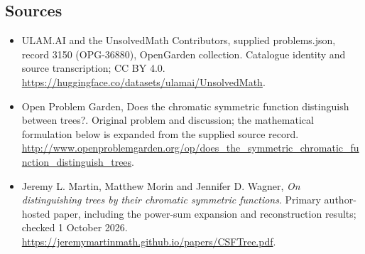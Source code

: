 \documentclass[11pt,a4paper]{article}
\begin{document}
\subsection{Sources}
\begin{itemize}
\item[S1] ULAM.AI and the UnsolvedMath Contributors, supplied problems.json, record 3150 (OPG-36880), OpenGarden collection. Catalogue identity and source transcription; CC BY 4.0.
\url{https://huggingface.co/datasets/ulamai/UnsolvedMath}.
\item[S2] Open Problem Garden, Does the chromatic symmetric function distinguish between trees?. Original problem and discussion; the mathematical formulation below is expanded from the supplied source record.
\url{http://www.openproblemgarden.org/op/does_the_symmetric_chromatic_function_distinguish_trees}.

\item[R1] Jeremy L. Martin, Matthew Morin and Jennifer D. Wagner,
\emph{On distinguishing trees by their chromatic symmetric functions}.
Primary author-hosted paper, including the power-sum expansion and
reconstruction results; checked 1 October 2026.
\url{https://jeremymartinmath.github.io/papers/CSFTree.pdf}.

\end{itemize}
\end{document}
